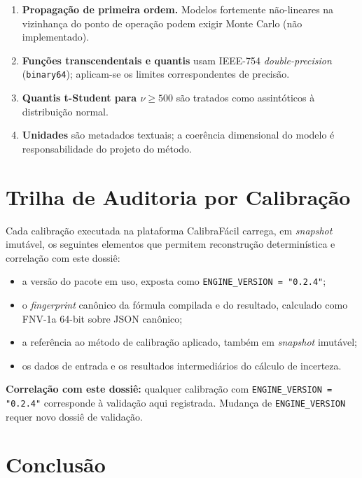 \documentclass[11pt,a4paper]{article}
\newcommand{\docVersion}{0.2.4}
\begin{document}
\begin{enumerate}
  \item \textbf{Propagação de primeira ordem.} Modelos fortemente não-lineares na vizinhança do ponto de operação podem exigir Monte Carlo (não implementado).
  \item \textbf{Funções transcendentais e quantis} usam IEEE-754 \emph{double-precision} (\texttt{binary64}); aplicam-se os limites correspondentes de precisão.
  \item \textbf{Quantis t-Student para \(\nu \geq 500\)} são tratados como assintóticos à distribuição normal.
  \item \textbf{Unidades} são metadados textuais; a coerência dimensional do modelo é responsabilidade do projeto do método.
\end{enumerate}

\section{Trilha de Auditoria por Calibração}

Cada calibração executada na plataforma CalibraFácil carrega, em \emph{snapshot} imutável, os seguintes elementos que permitem reconstrução determinística e correlação com este dossiê:

\begin{itemize}
  \item a versão do pacote em uso, exposta como \texttt{ENGINE\_VERSION = "\docVersion"};
  \item o \emph{fingerprint} canônico da fórmula compilada e do resultado, calculado como FNV-1a 64-bit sobre JSON canônico;
  \item a referência ao método de calibração aplicado, também em \emph{snapshot} imutável;
  \item os dados de entrada e os resultados intermediários do cálculo de incerteza.
\end{itemize}

\textbf{Correlação com este dossiê:} qualquer calibração com \texttt{ENGINE\_VERSION = "\docVersion"} corresponde à validação aqui registrada. Mudança de \texttt{ENGINE\_VERSION} requer novo dossiê de validação.

\section{Conclusão}
\end{document}
